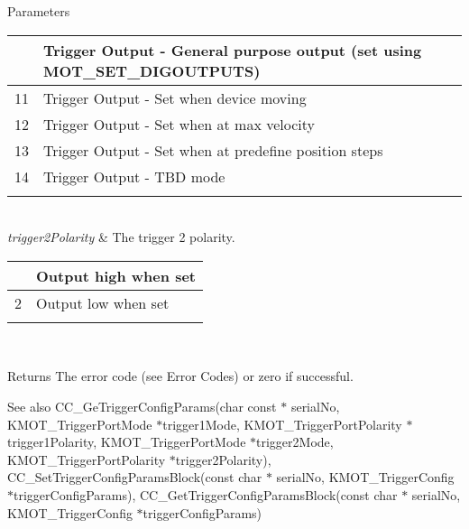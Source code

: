 \begin{DoxyParams}{Parameters}
\begin{tabularx}{\linewidth}{|*{2}{>{\raggedright\arraybackslash}X|}}
10&Trigger Output -\/ General purpose output (set using M\+O\+T\+\_\+\+S\+E\+T\+\_\+\+D\+I\+G\+O\+U\+T\+P\+U\+TS) \\\cline{1-2}
11&Trigger Output -\/ Set when device moving \\\cline{1-2}
12&Trigger Output -\/ Set when at max velocity \\\cline{1-2}
13&Trigger Output -\/ Set when at predefine position steps \\\cline{1-2}
14&Trigger Output -\/ T\+BD mode \\\cline{1-2}
\end{tabularx}
\\
\hline
{\em trigger2\+Polarity} & The trigger 2 polarity.\begin{tabularx}{\linewidth}{|*{2}{>{\raggedright\arraybackslash}X|}}\hline
1&Output high when set \\\cline{1-2}
2&Output low when set \\\cline{1-2}
\end{tabularx}
\\
\hline
\end{DoxyParams}
\begin{DoxyReturn}{Returns}
The error code (see Error Codes) or zero if successful. 
\end{DoxyReturn}
\begin{DoxySeeAlso}{See also}
C\+C\+\_\+\+Ge\+Trigger\+Config\+Params(char const $\ast$ serial\+No, K\+M\+O\+T\+\_\+\+Trigger\+Port\+Mode $\ast$trigger1\+Mode, K\+M\+O\+T\+\_\+\+Trigger\+Port\+Polarity $\ast$trigger1\+Polarity, K\+M\+O\+T\+\_\+\+Trigger\+Port\+Mode $\ast$trigger2\+Mode, K\+M\+O\+T\+\_\+\+Trigger\+Port\+Polarity $\ast$trigger2\+Polarity), C\+C\+\_\+\+Set\+Trigger\+Config\+Params\+Block(const char $\ast$ serial\+No, K\+M\+O\+T\+\_\+\+Trigger\+Config $\ast$trigger\+Config\+Params), C\+C\+\_\+\+Get\+Trigger\+Config\+Params\+Block(const char $\ast$ serial\+No, K\+M\+O\+T\+\_\+\+Trigger\+Config $\ast$trigger\+Config\+Params)


\end{DoxySeeAlso}
